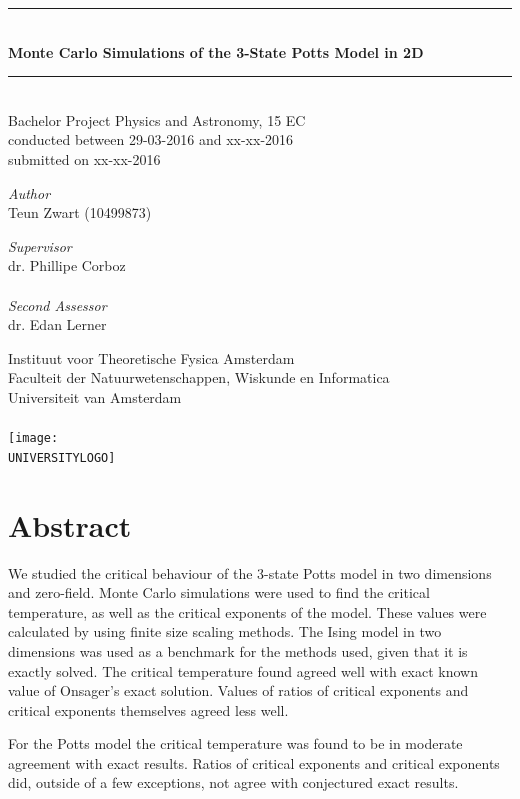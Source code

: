 \documentclass[11pt, a4paper]{report} %
\newcommand\TITLE{Monte Carlo Simulations of the 3-State Potts Model in 2D}
\newcommand\THESISFORM{Bachelor Project Physics and Astronomy, 15 EC\\conducted between 29-03-2016 and xx-xx-2016\\submitted on xx-xx-2016}
\newcommand\INSTITUTE{Instituut voor Theoretische Fysica Amsterdam}
\newcommand\FACULTY{Faculteit der Natuurwetenschappen, Wiskunde en Informatica}
\newcommand\UNIVERSITY{Universiteit van Amsterdam}
\newcommand\AUTHOR{Teun Zwart (10499873)}
\newcommand\SUPERVISOR{dr. Phillipe Corboz}
\newcommand\SECONDASSESSOR{dr. Edan Lerner}
\newcommand\UNIVERSITYLOGO{UvA-logo.png} %
\begin{document}
\begin{titlepage}
	\begin{center}
		\rule{\textwidth}{0.4mm}\\[0.5cm]
		\huge{\textbf{\TITLE}}
		\rule{\textwidth}{0.4mm}\\[0.5cm]
		\large{\THESISFORM}\\[0.5cm]
		\begin{minipage}[t]{0.4\textwidth}
			\begin{flushleft}
				\large\emph{Author}\\{\AUTHOR}
			\end{flushleft}
		\end{minipage}
		\begin{minipage}[t]{0.4\textwidth}
			\begin{flushright}
				\large\emph{Supervisor}\\{\SUPERVISOR}\\~\\
				\large\emph{Second Assessor}\\{\SECONDASSESSOR}
			\end{flushright}
		\end{minipage}
		\vfill
		\large{\INSTITUTE}\\
		\large{\FACULTY}\\
		\large{\UNIVERSITY}\\~\\
		\texttt{[image: \\UNIVERSITYLOGO]}
	\end{center}
\end{titlepage}

\thispagestyle{plain}
\section*{Abstract}

We studied the critical behaviour of the 3-state Potts model in two dimensions and zero-field.
Monte Carlo simulations were used to find the critical temperature, as well as the critical exponents of the model.
These values were calculated by using finite size scaling methods.
The Ising model in two dimensions was used as a benchmark for the methods used, given that it is exactly solved.
The critical temperature found agreed well with exact known value of Onsager's exact solution.
Values of ratios of critical exponents and critical exponents themselves agreed less well.

For the Potts model the critical temperature was found to be in moderate agreement with exact results.
Ratios of critical exponents and critical exponents did, outside of a few exceptions, not agree with conjectured exact results.
\end{document}

